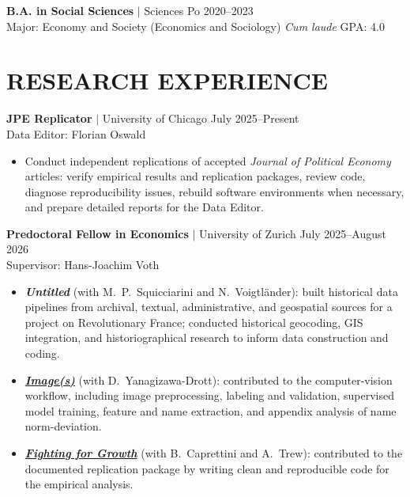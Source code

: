 \documentclass[a4paper,11pt]{article}
\begin{document}
\textbf{B.A. in Social Sciences} $|$ Sciences Po \hfill 2020--2023 \\
\hspace*{1em} Major: Economy and Society (Economics and Sociology) \hfill \textit{Cum laude} \quad GPA: 4.0


\section{RESEARCH EXPERIENCE}

\normalsize{\textbf{JPE Replicator} $|$ University of Chicago \hfill July 2025--Present \\
Data Editor: Florian Oswald}
\small{\begin{itemize}[itemsep=0em, before=\vspace{-0.9em}, after=\vspace{-0.45em}]
    \item Conduct independent replications of accepted \emph{Journal of Political Economy} articles: verify empirical results and replication packages, review code, diagnose reproducibility issues, rebuild software environments when necessary, and prepare detailed reports for the Data Editor.
\end{itemize}}

\normalsize{\textbf{Predoctoral Fellow in Economics} $|$ University of Zurich \hfill July 2025--August 2026 \\
Supervisor: Hans-Joachim Voth}
\small{\begin{itemize}[itemsep=0.1em, before=\vspace{-0.9em}, after=\vspace{-0.45em}]
    \item \textbf{\emph{Untitled}} (with M.~P.~Squicciarini and N.~Voigtländer): built historical data pipelines from archival, textual, administrative, and geospatial sources for a project on Revolutionary France; conducted historical geocoding, GIS integration, and historiographical research to inform data construction and coding.

    \item \href{https://www.jvoth.com/images_july_24.pdf}{\textbf{\emph{Image(s)}}} (with D.~Yanagizawa-Drott): contributed to the computer-vision workflow, including image preprocessing, labeling and validation, supervised model training, feature and name extraction, and appendix analysis of name norm-deviation.

    \item \href{https://brunocaprettini.com/wp-content/uploads/2024/05/napoleon.pdf}{\textbf{\emph{Fighting for Growth}}} (with B.~Caprettini and A.~Trew): contributed to the documented replication package by writing clean and reproducible code for the empirical analysis.
\end{itemize}}
\end{document}

